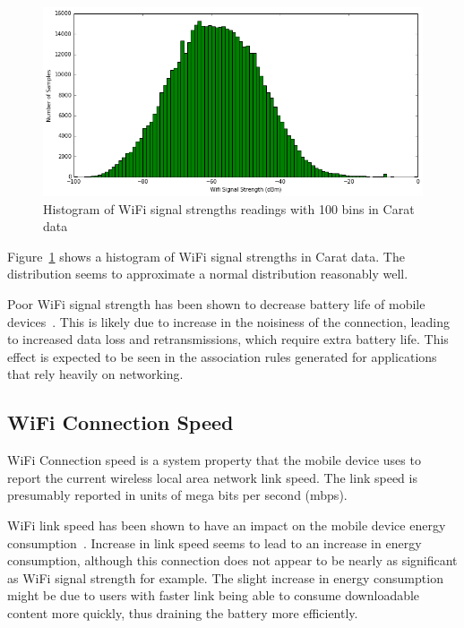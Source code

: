  \begin{figure} %
	\centering
	\includegraphics[width=\textwidth]{images/carat-data/wifi_signal_strength.png}
	\caption{Histogram of WiFi signal strengths readings with 100 bins in Carat data}
	\label{figure:carat-data-wifi-signal-strength}
\end{figure} 

Figure~\ref{figure:carat-data-wifi-signal-strength} shows a histogram of WiFi signal strengths in Carat data. The distribution seems to approximate a normal distribution reasonably well. 

Poor WiFi signal strength has been shown to decrease battery life of mobile devices~\cite{7146507}. This is likely due to increase in the noisiness of the connection, leading to increased data loss and retransmissions, which require extra battery life. This effect is expected to be seen in the association rules generated for applications that rely heavily on networking.

\subsection{WiFi Connection Speed}

WiFi Connection speed is a system property that the mobile device uses to report the current wireless local area network link speed. The link speed is presumably reported in units of mega bits per second (mbps). 

WiFi link speed has been shown to have an impact on the mobile device energy consumption~\cite{7146507, 5375354}. Increase in link speed seems to lead to an increase in energy consumption, although this connection does not appear to be nearly as significant as WiFi signal strength for example. The slight increase in energy consumption might be due to users with faster link being able to consume downloadable content more quickly, thus draining the battery more efficiently.


